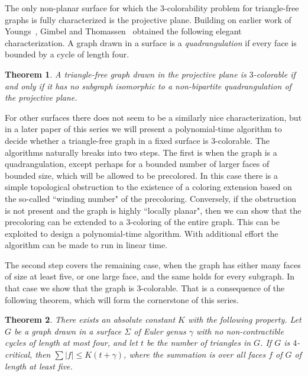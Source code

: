 \documentclass{article}
\def\mylabel#1{{\label{#1}}}
\newtheorem{theorem}{Theorem}
\begin{document}
The only non-planar surface for which the $3$-colorability problem
for triangle-free graphs is fully characterized is the projective plane.
Building on earlier work of Youngs~\cite{Youngs}, Gimbel and
Thomassen~\cite{gimbel} obtained the following elegant characterization.
A graph drawn in a surface is a {\em quadrangulation} if every face
is bounded by a cycle of length four.

\begin{theorem}
\mylabel{thm:gimtho}
A triangle-free graph drawn in the projective plane is $3$-colorable if and only
if it has no subgraph isomorphic to a non-bipartite
quadrangulation of the projective plane.
\end{theorem}

For other surfaces there does not seem to be a similarly nice characterization,
but in a later paper of this series we will present a polynomial-time
algorithm to decide whether a triangle-free graph in a fixed surface
is $3$-colorable.
The algorithms naturally breaks into two steps.
The first is when the graph is
a quadrangulation, except perhaps for a bounded number of larger faces
of bounded size, which will be allowed to be precolored.
In this case there is a simple topological obstruction to the existence
of a coloring extension based on the so-called ``winding number" of
the precoloring.
Conversely, if the obstruction is not present and the graph is highly
``locally planar", then we can show that the precoloring can be
extended to a $3$-coloring of the entire graph.
This can be exploited to design a polynomial-time algorithm.
With additional effort the algorithm can be made to run in linear time.

The second step covers the remaining case, when the graph has either many faces
of size at least five, or one large face, and the same holds for every
subgraph.
In that case we show that the graph is $3$-colorable.
That is a consequence of the following theorem, which will form the
cornerstone of this series.

\begin{theorem}
\mylabel{thm:corner}
There exists an absolute constant $K$ with the following property.
Let $G$ be a  graph drawn in a surface $\Sigma$ of Euler genus $\gamma$
with no non-contractible cycles of length at most four,  and let $t$ be
the number of triangles in $G$.
If $G$ is $4$-critical, 
then $\sum|f|\le K(t+\gamma)$,
where the summation is over all faces $f$ of $G$ of length at least five.
\end{theorem}
\end{document}
